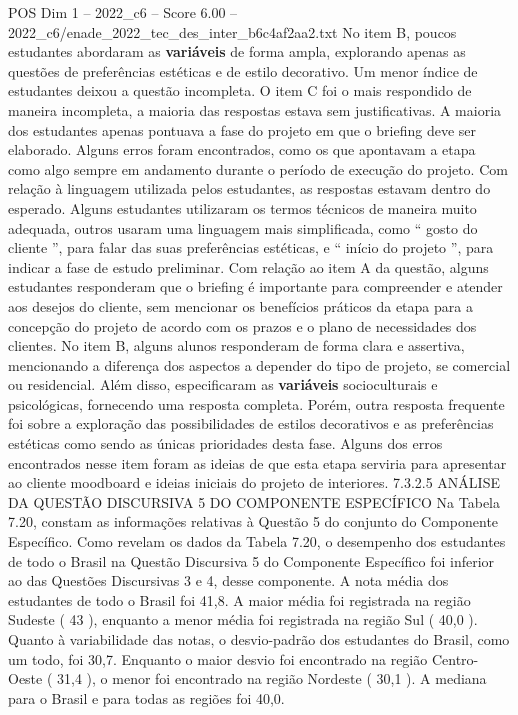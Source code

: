\begin{textsample}{POS Dim 1 – 2022\_c6 – Score 6.00 – 2022\_c6/enade\_2022\_tec\_des\_inter\_b6c4af2aa2.txt}
No item B, poucos estudantes abordaram as \textbf{variáveis} de forma ampla, explorando apenas as questões de preferências estéticas e de estilo decorativo.
Um menor índice de estudantes deixou a questão incompleta.
O item C foi o mais respondido de maneira incompleta, a maioria das respostas estava sem justificativas.
A maioria dos estudantes apenas pontuava a fase do projeto em que o briefing deve ser elaborado.
Alguns erros foram encontrados, como os que apontavam a etapa como algo sempre em andamento durante o período de execução do projeto.
Com relação à linguagem utilizada pelos estudantes, as respostas estavam dentro do esperado.
Alguns estudantes utilizaram os termos técnicos de maneira muito adequada, outros usaram uma linguagem mais simplificada, como “ gosto do cliente ”, para falar das suas preferências estéticas, e “ início do projeto ”, para indicar a fase de estudo preliminar.
Com relação ao item A da questão, alguns estudantes responderam que o briefing é importante para compreender e atender aos desejos do cliente, sem mencionar os benefícios práticos da etapa para a concepção do projeto de acordo com os prazos e o plano de necessidades dos clientes.
No item B, alguns alunos responderam de forma clara e assertiva, mencionando a diferença dos aspectos a depender do tipo de projeto, se comercial ou residencial.
Além disso, especificaram as \textbf{variáveis} socioculturais e psicológicas, fornecendo uma resposta completa.
Porém, outra resposta frequente foi sobre a exploração das possibilidades de estilos decorativos e as preferências estéticas como sendo as únicas prioridades desta fase.
Alguns dos erros encontrados nesse item foram as ideias de que esta etapa serviria para apresentar ao cliente moodboard e ideias iniciais do projeto de interiores. 7.3.2.5 ANÁLISE DA QUESTÃO DISCURSIVA 5 DO COMPONENTE ESPECÍFICO Na Tabela 7.20, constam as informações relativas à Questão 5 do conjunto do Componente Específico.
Como revelam os dados da Tabela 7.20, o desempenho dos estudantes de todo o Brasil na Questão Discursiva 5 do Componente Específico foi inferior ao das Questões Discursivas 3 e 4, desse componente.
A nota média dos estudantes de todo o Brasil foi 41,8.
A maior média foi registrada na região Sudeste ( 43 ), enquanto a menor média foi registrada na região Sul ( 40,0 ).
Quanto à variabilidade das notas, o desvio-padrão dos estudantes do Brasil, como um todo, foi 30,7.
Enquanto o maior desvio foi encontrado na região Centro-Oeste ( 31,4 ), o menor foi encontrado na região Nordeste ( 30,1 ).
A mediana para o Brasil e para todas as regiões foi 40,0.

\end{textsample}
